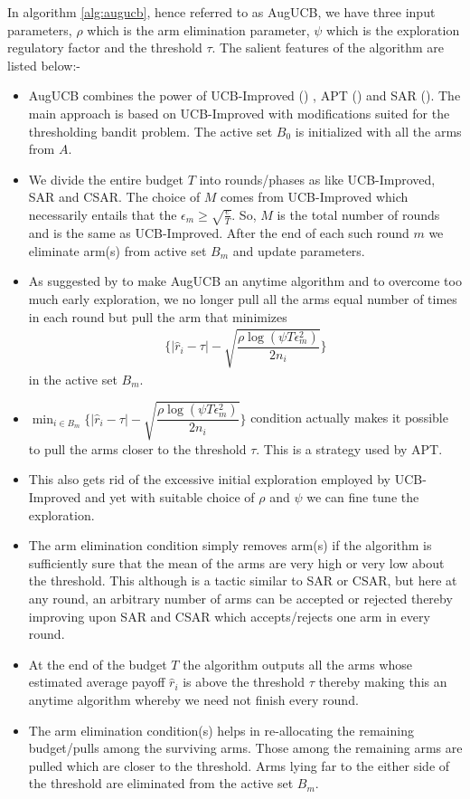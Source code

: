 In algorithm \ref{alg:augucb}, hence referred to as AugUCB, we have three input parameters, $\rho$ which is the arm elimination parameter, $\psi$ which is the exploration regulatory factor and the threshold $\tau$. The salient features of the algorithm are listed below:-
\begin{itemize}
\item AugUCB combines the power of UCB-Improved (\cite{auer2010ucb}) , APT (\cite{locatelli2016optimal}) and SAR (\cite{gabillon2011multi}). The main approach is based on UCB-Improved with modifications suited for the thresholding bandit problem. The active set $B_{0}$ is initialized with all the arms from $A$.
\item We divide the entire budget $T$ into rounds/phases as like UCB-Improved, SAR  and CSAR. The choice of $M$ comes from UCB-Improved which necessarily entails that the $\epsilon_{m}\geq \sqrt{\frac{e}{T}}$. So, $M$ is the total number of rounds and is the same as UCB-Improved. After the end of each such round $m$ we eliminate arm(s) from active set $B_{m}$ and update parameters.
\item As suggested by \cite{liu2016modification} to make AugUCB an anytime algorithm and to overcome too much early exploration, we no longer pull all the arms equal number of times in each round but pull the arm that minimizes 
\begin{align*}
\bigg\lbrace |\hat{r}_{i} - \tau | - \sqrt{\dfrac{\rho \log (\psi T \epsilon_{m}^{2})}{2 n_{i}}} \bigg\rbrace
\end{align*}
in the active set $B_{m}$. 
\item $\min_{i\in B_{m}}\bigg\lbrace |\hat{r}_{i} - \tau | - \sqrt{\dfrac{\rho \log (\psi T \epsilon_{m}^{2})}{2 n_{i}}} \bigg\rbrace$ condition actually makes it possible to pull the arms closer to the threshold $\tau$. This is a strategy used by APT.
\item This also gets rid of the excessive initial exploration employed by UCB-Improved and yet with suitable choice of $\rho$ and $\psi$ we can fine tune the exploration.
\item The arm elimination condition simply removes arm(s) if the algorithm is sufficiently sure that the mean of the arms are very high or very low about the threshold. This although is a tactic similar to SAR or CSAR, but here at any round, an arbitrary number of arms can be accepted or rejected thereby improving upon SAR and CSAR which accepts/rejects one arm in every round.
\item At the end of the budget $T$ the algorithm outputs all the arms whose estimated average payoff $\hat{r}_{i}$ is above the threshold $\tau$ thereby making this an anytime algorithm whereby we need not finish every round.
\item The arm elimination condition(s) helps in re-allocating the remaining budget/pulls among the surviving arms. Those among the remaining arms are pulled which are closer to the threshold. Arms lying far to the either side of the threshold are eliminated from the active set $B_{m}$.
\end{itemize}